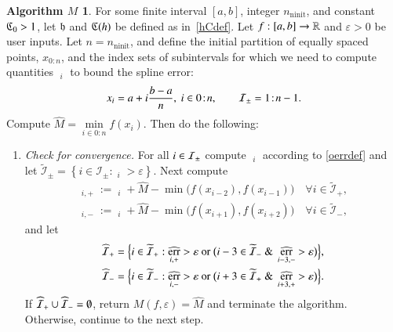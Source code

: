 \documentclass[review]{elsarticle}
\newcommand{\abstol}{\varepsilon}
\newcommand{\zton}{0\!:\!n}
\theoremstyle{definition}
\newtheorem*{algoM}{Algorithm $M$}
\newcommand{\hM}{\widehat{M}}
\DeclareMathOperator{\ninit}{ninit}
\DeclareMathOperator{\oerr}{\overline{err}}
\DeclareMathOperator{\herr}{\widehat{err}}
\newcommand{\minfi}{\min\limits_{i \in 0:n} f(x_i)} %
\begin{document}
\begin{algoM} \label{AlgoM}
	For some finite interval $[a,b]$, integer $n_{\ninit}$, and constant $\mathfrak{C}_0 > 1$, let
	$\mathfrak{h}$ and $\mathfrak{C}(h)$ be defined as in~\eqref{hCdef}.  Let $f:[a,b] \to \mathbb{R}$ and
	$\abstol >0$ be user inputs. Let
	$n=n_{\ninit}$, and define the initial partition of equally spaced points, $x_{0:n}$, and
	the index sets of subintervals for which we need to compute quantities $\oerr_{i}$ to
	bound the spline error:
\[
x_i=a+ i\frac{b-a}{n}, \ i \in \zton, \qquad \ci_{\pm} =  1\!:\!n-1.
\]
	Compute $\hM= \minfi$.
	Then do the
	following:
	
	\begin{enumerate}[\em Step 1.]
		
		\item \label{stagemin1} \emph{Check for convergence.} For all $i \in \mathcal{I}_{\pm}$
		compute $\oerr_i $ according to \eqref{oerrdef} and let
		$\widetilde{\mathcal{I}}_{\pm} = \left\{i \in \mathcal{I}_{\pm}: \oerr_i
		> \abstol \right\}$.  Next compute
		\begin{gather*}
		\herr_{i,+} := \oerr_i + \hM - \min\bigl(f(x_{i - 2}),f(x_{i-1})\bigr) \quad
		\forall i \in \widetilde{\mathcal{I}}_{+}, \\
		\herr_{i,-} := \oerr_i + \hM - \min\bigl(f(x_{i +1}),f(x_{i+2})\bigr)  \quad
		\forall i \in \widetilde{\mathcal{I}}_{-},		
		\end{gather*}
		and let
		\begin{gather*}
				\widehat{\ci}_+ = \Bigl\{i \in \widetilde{\ci}_+:  \herr_{i,+} > \abstol \text{ or }
				\bigl( i-3 \in \widetilde{\ci}_- \text{ \& } \herr_{i-3,-} > \abstol \bigr) \Bigr\}, \\
				\widehat{\ci}_- = \Bigl\{i \in \widetilde{\ci}_-: \herr_{i,-} > \abstol \text{ or }
				\bigl( i+3\in \widetilde{\ci}_+ \text{ \& } \herr_{i+3,+} > \abstol \bigr) \Bigr\}.
		\end{gather*}
		If $\widehat{\mathcal{I}}_+ \cup \widehat{\mathcal{I}}_- =
		\emptyset$, return $M(f,\abstol) = \widehat{M}$ and terminate the algorithm.
		Otherwise, continue to the next step.
		

\end{enumerate}
\end{algoM}
\end{document}
